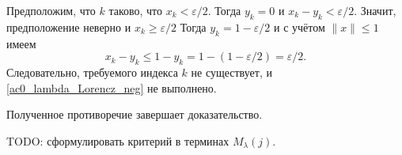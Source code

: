 \documentclass[a4paper,14pt]{article} %
\begin{document}
Предположим, что $k$ таково, что $x_k < \varepsilon/2$.
Тогда $y_k = 0$ и $x_k - y_k < \varepsilon/2$.
Значит, предположение неверно и $x_k \geq \varepsilon/2$
Тогда $y_k = 1-\varepsilon/2$ и с учётом $\|x\|\leq 1$ имеем
\begin{equation}
	x_k - y_k \leq 1- y_k = 1 - (1-\varepsilon/2) = \varepsilon/2
	.
\end{equation}
Следовательно, требуемого индекса $k$ не существует,
и \eqref{ac0_lambda_Lorencz_neg} не выполнено.

Полученное противоречие завершает доказательство.


TODO: сформулировать критерий в терминах $M_\lambda(j)$.
\end{document}
